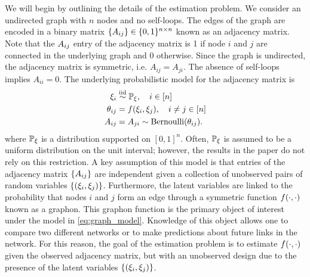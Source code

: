 \documentclass[11pt]{article}
\begin{document}
We will begin by outlining the details of the estimation problem. We consider an undirected graph with $n$ nodes and no self-loops. The edges of the graph are encoded in a binary matrix $\{A_{ij}\} \in \{0, 1\}^{n \times n}$ known as an adjacency matrix. Note that the $A_{ij}$ entry of the adjacency matrix is 1 if node $i$ and $j$ are connected in the underlying graph and 0 otherwise. Since the graph is undirected, the adjacency matrix is symmetric, i.e. $A_{ij} = A_{ji}$. The absence of self-loops implies $A_{ii} = 0$. The underlying probabilistic model for the adjacency matrix is
\begin{equation}\label{eq:graph_model}
\begin{aligned}
\xi_i &\overset{\text{iid}}{\sim} \mathbb{P}_{\xi}, \quad i \in \lbrack n\rbrack \\
\theta_{ij} &= f(\xi_{i}, \xi_{j}), \quad i \neq j \in \lbrack n\rbrack \\
A_{ij} &= A_{ji} \sim \operatorname{Bernoulli}(\theta_{ij}).
\end{aligned}
\end{equation}
where $\mathbb{P}_{\xi}$ is a distribution supported on $[0, 1]^n$. Often, $\mathbb{P}_{\xi}$ is assumed to be a uniform distribution on the unit interval; however, the results in the paper do not rely on this restriction. A key assumption of this model is that entries of the adjacency matrix $\{A_{ij}\}$ are independent given a collection of unobserved pairs of random variables $\{(\xi_i, \xi_j)\}$. Furthermore, the latent variables are linked to the probability that nodes $i$ and $j$ form an edge through a symmetric function $f(\cdot, \cdot)$ known as a graphon. This graphon function is the primary object of interest under the model in \ref{eq:graph_model}. Knowledge of this object allows one to compare two different networks or to make predictions about future links in the network.
For this reason, the goal of the estimation problem is to estimate $f(\cdot, \cdot)$ given the observed adjacency matrix, but with an unobserved design due to the presence of the latent variables $\{(\xi_i, \xi_j)\}$.
\end{document}
